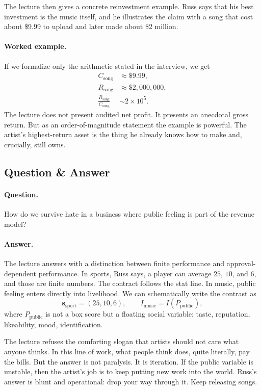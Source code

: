 The lecture then gives a concrete reinvestment example. Russ says that his best investment is the music itself, and he illustrates the claim with a song that cost about \$9.99 to upload and later made about \$2 million.

\paragraph{Worked example.} If we formalize only the arithmetic stated in the interview, we get
\begin{align}
C_{\mathrm{song}} &\approx \$9.99,\\
R_{\mathrm{song}} &\approx \$2{,}000{,}000,\\
\frac{R_{\mathrm{song}}}{C_{\mathrm{song}}} &\sim 2\times 10^5.
\end{align}
The lecture does not present audited net profit. It presents an anecdotal gross return. But as an order-of-magnitude statement the example is powerful. The artist's highest-return asset is the thing he already knows how to make and, crucially, still owns.

\subsection{Question \& Answer}

\paragraph{Question.} How do we survive hate in a business where public feeling is part of the revenue model?

\paragraph{Answer.} The lecture answers with a distinction between finite performance and approval-dependent performance. In sports, Russ says, a player can average \(25\), \(10\), and \(6\), and those are finite numbers. The contract follows the stat line. In music, public feeling enters directly into livelihood. We can schematically write the contrast as
\begin{equation}
\mathbf{s}_{\mathrm{sport}}=(25,10,6),\qquad I_{\mathrm{music}}=I\!\left(P_{\mathrm{public}}\right),
\end{equation}
where \(P_{\mathrm{public}}\) is not a box score but a floating social variable: taste, reputation, likeability, mood, identification.

The lecture refuses the comforting slogan that artists should not care what anyone thinks. In this line of work, what people think does, quite literally, pay the bills. But the answer is not paralysis. It is iteration. If the public variable is unstable, then the artist's job is to keep putting new work into the world. Russ's answer is blunt and operational: drop your way through it. Keep releasing songs.

